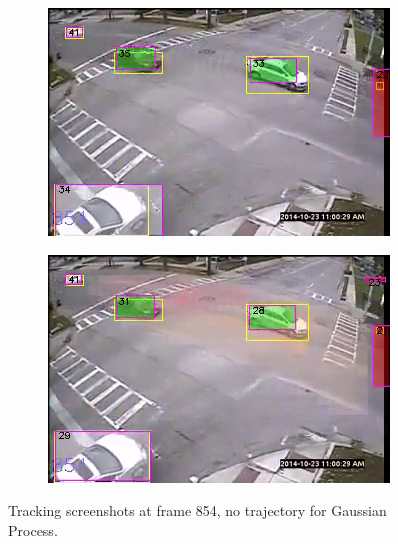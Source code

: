\begin{figure}
\centering
    \begin{subfigure}{0.43\linewidth}
        \includegraphics[width=\linewidth]{./img/gp/193402-kf-1.png}
        \label{subfig:kf-1}
    \end{subfigure}
    \begin{subfigure}{0.43\linewidth}
        \includegraphics[width=\linewidth]{./img/gp/193402-gp-1.png}
        \label{subfig:gp-1}
    \end{subfigure}%
    \caption{Tracking screenshots at frame 854, no trajectory for Gaussian Process.}
    \label{fig:kf-gp-1}
\end{figure}

